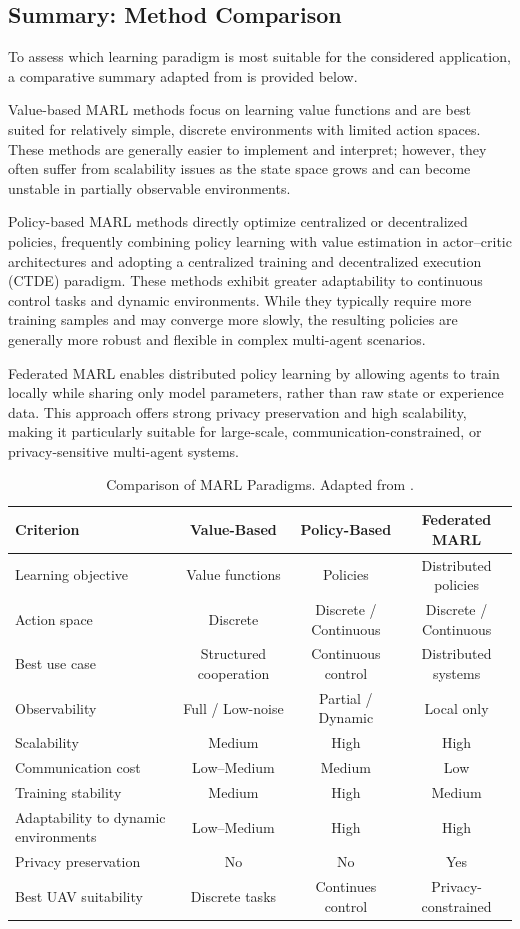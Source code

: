 \subsection{Summary: Method Comparison}
To assess which learning paradigm is most suitable for the considered application, a comparative summary adapted from \cite{ekecki2025uavcontrolsurvey} is provided below. 

Value-based MARL methods focus on learning value functions and are best suited for relatively simple, discrete environments with limited action spaces. These methods are generally easier to implement and interpret; however, they often suffer from scalability issues as the state space grows and can become unstable in partially observable environments.

Policy-based MARL methods directly optimize centralized or decentralized policies, frequently combining policy learning with value estimation in actor–critic architectures and adopting a centralized training and decentralized execution (CTDE) paradigm. These methods exhibit greater adaptability to continuous control tasks and dynamic environments. While they typically require more training samples and may converge more slowly, the resulting policies are generally more robust and flexible in complex multi-agent scenarios.

Federated MARL enables distributed policy learning by allowing agents to train locally while sharing only model parameters, rather than raw state or experience data. This approach offers strong privacy preservation and high scalability, making it particularly suitable for large-scale, communication-constrained, or privacy-sensitive multi-agent systems.


\begin{table}[htbp]
\centering
\caption{Comparison of MARL Paradigms. Adapted from \cite{ekecki2025uavcontrolsurvey}.}
\label{tab:marl_paradigms_short}
\begin{tabular}{lccc}
\hline
\textbf{Criterion} & \textbf{Value-Based} & \textbf{Policy-Based} & \textbf{Federated MARL} \\
\hline
Learning objective & Value functions & Policies & Distributed policies \\
Action space & Discrete & Discrete / Continuous & Discrete / Continuous \\
Best use case & Structured cooperation & Continuous control & Distributed systems \\
Observability & Full / Low-noise & Partial / Dynamic & Local only \\
Scalability & Medium & High & High \\
Communication cost & Low–Medium & Medium & Low \\
Training stability & Medium & High & Medium \\
Adaptability to dynamic environments & Low–Medium & High & High \\
Privacy preservation & No & No & Yes \\
Best UAV suitability & Discrete tasks & Continues control & Privacy-constrained  \\
\hline
\end{tabular}
\end{table}



